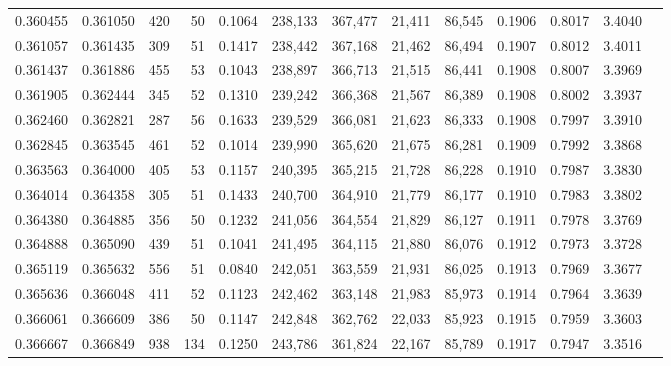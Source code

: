\begin{tabular}{rrrrrrrrrrrrr}
0.360455 & 0.361050 &    420 &    50 &                                     0.1064 & 238,133 & 367,477 &  21,411 &  86,545 & 0.1906 & 0.8017 & 3.4040 \\
0.361057 & 0.361435 &    309 &    51 &                                     0.1417 & 238,442 & 367,168 &  21,462 &  86,494 & 0.1907 & 0.8012 & 3.4011 \\
0.361437 & 0.361886 &    455 &    53 &                                     0.1043 & 238,897 & 366,713 &  21,515 &  86,441 & 0.1908 & 0.8007 & 3.3969 \\
0.361905 & 0.362444 &    345 &    52 &                                     0.1310 & 239,242 & 366,368 &  21,567 &  86,389 & 0.1908 & 0.8002 & 3.3937 \\
0.362460 & 0.362821 &    287 &    56 &                                     0.1633 & 239,529 & 366,081 &  21,623 &  86,333 & 0.1908 & 0.7997 & 3.3910 \\
0.362845 & 0.363545 &    461 &    52 &                                     0.1014 & 239,990 & 365,620 &  21,675 &  86,281 & 0.1909 & 0.7992 & 3.3868 \\
0.363563 & 0.364000 &    405 &    53 &                                     0.1157 & 240,395 & 365,215 &  21,728 &  86,228 & 0.1910 & 0.7987 & 3.3830 \\
0.364014 & 0.364358 &    305 &    51 &                                     0.1433 & 240,700 & 364,910 &  21,779 &  86,177 & 0.1910 & 0.7983 & 3.3802 \\
0.364380 & 0.364885 &    356 &    50 &                                     0.1232 & 241,056 & 364,554 &  21,829 &  86,127 & 0.1911 & 0.7978 & 3.3769 \\
0.364888 & 0.365090 &    439 &    51 &                                     0.1041 & 241,495 & 364,115 &  21,880 &  86,076 & 0.1912 & 0.7973 & 3.3728 \\
0.365119 & 0.365632 &    556 &    51 &                                     0.0840 & 242,051 & 363,559 &  21,931 &  86,025 & 0.1913 & 0.7969 & 3.3677 \\
0.365636 & 0.366048 &    411 &    52 &                                     0.1123 & 242,462 & 363,148 &  21,983 &  85,973 & 0.1914 & 0.7964 & 3.3639 \\
0.366061 & 0.366609 &    386 &    50 &                                     0.1147 & 242,848 & 362,762 &  22,033 &  85,923 & 0.1915 & 0.7959 & 3.3603 \\
0.366667 & 0.366849 &    938 &   134 &                                     0.1250 & 243,786 & 361,824 &  22,167 &  85,789 & 0.1917 & 0.7947 & 3.3516 \\

\end{tabular}
